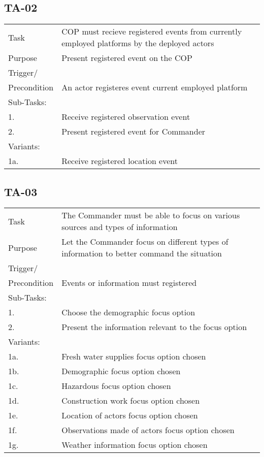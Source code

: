 \subsection{TA-02}
\begin{longtable}{| p{2.5cm}  | p{10cm} |  }
	\hline
	Task & COP must recieve registered events from currently employed platforms by the deployed actors  \\
	Purpose & Present registered event on the COP \\
	Trigger/ &  \\Precondition & An actor registeres event current employed platform \\
	\hline
	Sub-Tasks: & \\
	1. & Receive registered observation event \\
	2. & Present registered event for Commander \\
	\hline
	Variants: & \\
	1a. & Receive registered location event \\
	\hline
\end{longtable}

\FloatBarrier
\newpage

\subsection{TA-03}
\begin{longtable}{| p{2.5cm}  | p{10cm} |  }
	\hline
	Task & The Commander must be able to focus on various sources and types of information  \\
	Purpose & Let the Commander focus on different types of information to better command the situation \\
	Trigger/ &  \\ Precondition & Events or information must registered \\
	\hline
	Sub-Tasks: & \\
	1. & Choose the demographic focus option \\
	2. & Present the information relevant to the focus option \\
	\hline
	Variants: & \\
	1a. & Fresh water supplies focus option chosen \\
	1b. & Demographic focus option chosen \\
	1c. & Hazardous focus option chosen \\
	1d. & Construction work focus option chosen \\
	1e. & Location of actors focus option chosen \\
	1f. & Observations made of actors focus option chosen \\
	1g. & Weather information focus option chosen \\
	\hline
\end{longtable}

